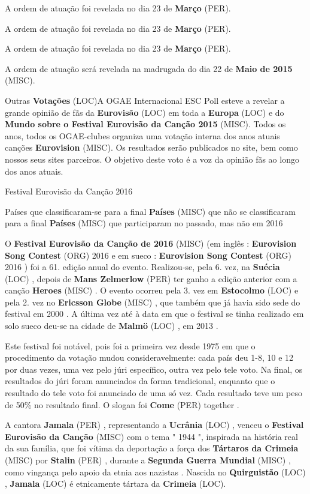 \documentclass[12pt,a4paper]{article}
\begin{document}
A ordem de atuação foi revelada no dia 23 de \textbf{Março} (PER).

A ordem de atuação foi revelada no dia 23 de \textbf{Março} (PER).

A ordem de atuação foi revelada no dia 23 de \textbf{Março} (PER).

A ordem de atuação será revelada na madrugada do dia 22 de \textbf{Maio de 2015} (MISC).



Outras \textbf{Votações} (LOC)A OGAE Internacional ESC Poll esteve a revelar a grande opinião de fãs da \textbf{Eurovisão} (LOC) em toda a \textbf{Europa} (LOC) e do \textbf{Mundo sobre o Festival Eurovisão da Canção 2015} (MISC). Todos os anos, todos os OGAE-clubes organiza uma votação interna dos anos atuais canções \textbf{Eurovision} (MISC). Os resultados serão publicados no site, bem como nossos seus sites parceiros. O objetivo deste voto é a voz da opinião fãs ao longo dos anos atuais.



Festival Eurovisão da Canção 2016



Países que classificaram-se para a final \textbf{Países} (MISC) que não se classificaram para a final \textbf{Países} (MISC) que participaram no passado, mas não em 2016

O \textbf{Festival Eurovisão da Canção de 2016} (MISC) (em inglês : \textbf{Eurovision Song Contest} (ORG) 2016 e em sueco : \textbf{Eurovision Song Contest} (ORG) 2016 ) foi a 61. edição anual do evento. Realizou-se, pela 6. vez, na \textbf{Suécia} (LOC) , depois de \textbf{Mans Zelmerlow} (PER) ter ganho a edição anterior com a canção \textbf{Heroes} (MISC) . O evento ocorreu pela 3. vez em \textbf{Estocolmo} (LOC) e pela 2. vez no \textbf{Ericsson Globe} (MISC) , que também que já havia sido sede do festival em 2000 . A última vez até à data em que o festival se tinha realizado em solo sueco deu-se na cidade de \textbf{Malmö} (LOC) , em 2013 .

Este festival foi notável, pois foi a primeira vez desde 1975 em que o procedimento da votação mudou consideravelmente: cada país deu 1-8, 10 e 12 por duas vezes, uma vez pelo júri específico, outra vez pelo tele voto. Na final, os resultados do júri foram anunciados da forma tradicional, enquanto que o resultado do tele voto foi anunciado de uma só vez. Cada resultado teve um peso de 50\% no resultado final. O slogan foi \textbf{Come} (PER) together .

A cantora \textbf{Jamala} (PER) , representando a \textbf{Ucrânia} (LOC) , venceu o \textbf{Festival Eurovisão da Canção} (MISC) com o tema " 1944 ", inspirada na história real da sua família, que foi vítima da deportação a força dos \textbf{Tártaros da Crimeia} (MISC) por \textbf{Stalin} (PER) , durante a \textbf{Segunda Guerra Mundial} (MISC) , como vingança pelo apoio da etnia aos nazistas . Nascida no \textbf{Quirguistão} (LOC) , \textbf{Jamala} (LOC) é etnicamente tártara da \textbf{Crimeia} (LOC).
\end{document}
